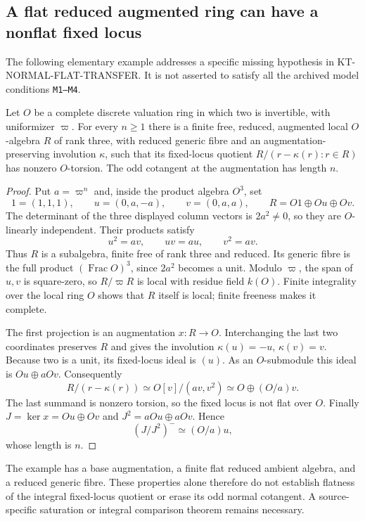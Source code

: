 \subsection{A flat reduced augmented ring can have a nonflat fixed locus}
\label{sec:kt-fixed-locus-nonflat}

The following elementary example addresses a specific missing
hypothesis in KT-NORMAL-FLAT-TRANSFER.  It is not asserted to
satisfy all the archived model conditions \texttt{M1--M4}.

\begin{lemma}
Let $O$ be a complete discrete valuation ring in which two
is invertible, with uniformizer $\varpi$.  For every $n\geq1$
there is a finite free, reduced, augmented local $O$-algebra
$R$ of rank three, with reduced generic fibre and an
augmentation-preserving involution $\kappa$, such that its
fixed-locus quotient $R/(r-\kappa(r):r\in R)$ has nonzero
$O$-torsion.  The odd cotangent at the augmentation has
length $n$.
\end{lemma}
\begin{proof}
Put $a=\varpi^n$ and, inside the product algebra $O^3$, set
\[
  1=(1,1,1),\qquad u=(0,a,-a),\qquad v=(0,a,a),
  \qquad R=O1\oplus Ou\oplus Ov.
\]
The determinant of the three displayed column vectors is
$2a^2\ne0$, so they are $O$-linearly independent.  Their
products satisfy
\[
                 u^2=av,\qquad uv=au,\qquad v^2=av.
\]
Thus $R$ is a subalgebra, finite free of rank three and
reduced.  Its generic fibre is the full product
$(\operatorname{Frac}O)^3$, since $2a^2$ becomes a unit.
Modulo $\varpi$, the span of $u,v$ is square-zero, so
$R/\varpi R$ is local with residue field $k(O)$.
Finite integrality over the local ring $O$ shows that $R$
itself is local; finite freeness makes it complete.

The first projection is an augmentation $x:R\to O$.
Interchanging the last two coordinates preserves $R$
and gives the involution
$\kappa(u)=-u$, $\kappa(v)=v$.
Because two is a unit, its fixed-locus ideal is $(u)$.
As an $O$-submodule this ideal is $Ou\oplus aOv$.
Consequently
\[
 R/(r-\kappa(r))\simeq O[v]/(av,v^2)
             \simeq O\oplus(O/a)v.
\]
The last summand is nonzero torsion, so the fixed locus
is not flat over $O$.  Finally $J=\ker x=Ou\oplus Ov$
and $J^2=aOu\oplus aOv$.  Hence
\[
                     (J/J^2)^-\simeq(O/a)u,
\]
whose length is $n$.
\end{proof}

The example has a base augmentation, a finite flat reduced
ambient algebra, and a reduced generic fibre.  These
properties alone therefore do not establish flatness of
the integral fixed-locus quotient or erase its odd normal
cotangent.  A source-specific saturation or integral
comparison theorem remains necessary.
